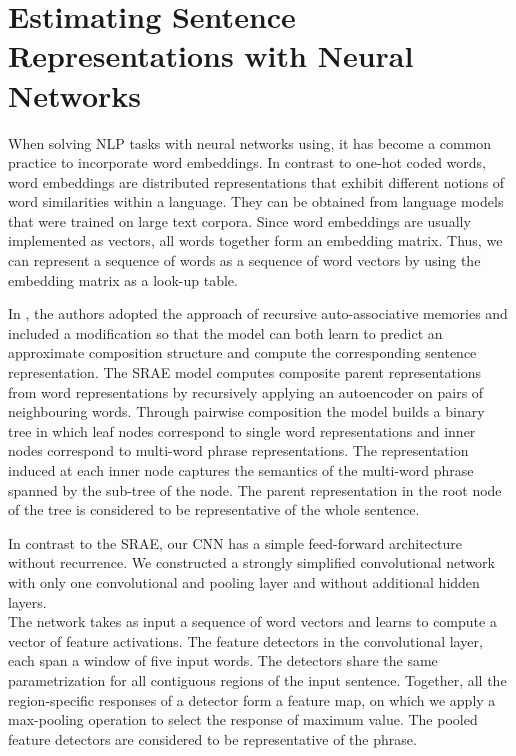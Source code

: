 \documentclass{llncs}
\begin{document}
\section{Estimating Sentence Representations with Neural Networks}
When solving NLP tasks with neural networks using, it has become a common practice to incorporate word embeddings. In contrast to one-hot coded words, word embeddings are distributed representations that exhibit different notions of word similarities within a language. They can be obtained from language models that were trained on large text corpora. Since word embeddings are usually implemented as vectors, all words together form an embedding matrix. Thus, we can represent a sequence of words as a sequence of word vectors by using the embedding matrix as a look-up table.

In \cite{socher:2011}, the authors adopted the approach of recursive auto-associative memories\cite{pollack} and included a modification so that the model can both learn to predict an approximate composition structure and compute the corresponding sentence representation. The SRAE model computes composite parent representations from word representations by recursively applying an autoencoder on pairs of neighbouring words. Through pairwise composition the model builds a binary tree in which leaf nodes correspond to single word representations and inner nodes correspond to multi-word phrase representations. The representation induced at each inner node captures the semantics of the multi-word phrase spanned by the sub-tree of the node. The parent representation in the root node of the tree is considered to be representative of the whole sentence.

In contrast to the SRAE, our CNN has a simple feed-forward architecture without recurrence. We constructed a strongly simplified convolutional network with only one convolutional and pooling layer and without additional hidden layers.\\
The network takes as input a sequence of word vectors and learns to compute a vector of feature activations. The feature detectors in the convolutional layer, each span a window of five input words. The detectors share the same parametrization for all contiguous regions of the input sentence. Together, all the region-specific responses of a detector form a feature map, on which we apply a max-pooling operation to select the response of maximum value. The pooled feature detectors are considered to be representative of the phrase. 
\end{document}
